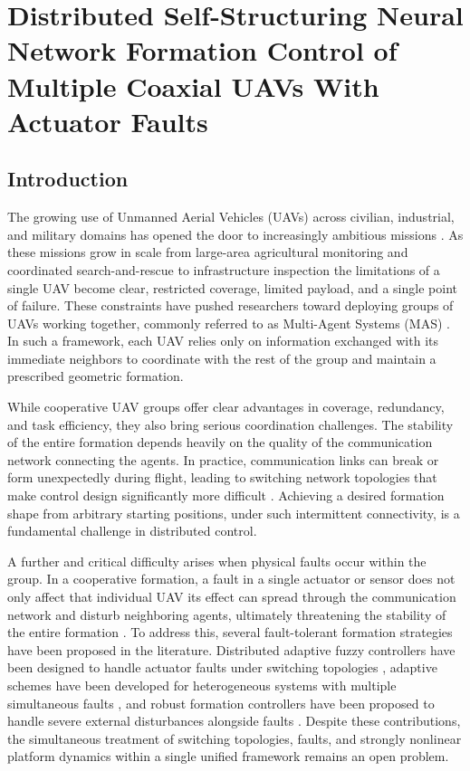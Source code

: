\chapter{Distributed Self-Structuring Neural Network Formation Control of Multiple Coaxial UAVs With Actuator Faults}

\section{Introduction}

The growing use of Unmanned Aerial Vehicles (UAVs) across civilian, industrial,
and military domains has opened the door to increasingly ambitious missions
\cite{UAV_rev, UAV_rev1}. As these missions grow in scale  from large-area
agricultural monitoring and coordinated search-and-rescue to infrastructure
inspection  the limitations of a single UAV become clear, restricted coverage,
limited payload, and a single point of failure. These constraints have pushed
researchers toward deploying groups of UAVs working together, commonly referred
to as Multi-Agent Systems (MAS) \cite{formation_control_rv1, formation_control_rv3}.
In such a framework, each UAV relies only on information exchanged with its
immediate neighbors to coordinate with the rest of the group and maintain a
prescribed geometric formation.

While cooperative UAV groups offer clear advantages in coverage, redundancy, and
task efficiency, they also bring serious coordination challenges. The stability
of the entire formation depends heavily on the quality of the communication
network connecting the agents. In practice, communication links can break or
form unexpectedly during flight, leading to switching network topologies that
make control design significantly more difficult \cite{Switching_Topology_2021}.
Achieving a desired formation shape from arbitrary starting positions, under
such intermittent connectivity, is a fundamental challenge in distributed
control.

A further and critical difficulty arises when physical faults occur within the
group. In a cooperative formation, a fault in a single actuator or sensor does not only
affect that individual UAV  its effect can spread through the communication
network and disturb neighboring agents, ultimately threatening the stability of
the entire formation \cite{formation_control_fault1}. To address this, several
fault-tolerant formation strategies have been proposed in the literature.
Distributed adaptive fuzzy controllers have been designed to handle actuator
faults under switching topologies \cite{formation_control_fault1}, adaptive
schemes have been developed for heterogeneous systems with multiple simultaneous
faults \cite{A_fault}, and robust formation controllers have
been proposed to handle severe external disturbances alongside faults
\cite{formation_control_fault3}. Despite these contributions, the simultaneous
treatment of switching topologies, faults, and strongly nonlinear
platform dynamics within a single unified framework remains an open problem.

